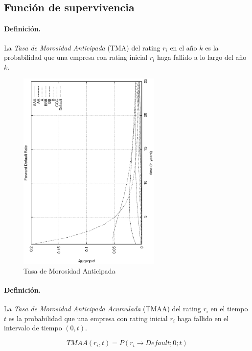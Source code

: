 \subsection{Funci\'on de supervivencia}

\paragraph{Definici\'on.} La \emph{Tasa de Morosidad Anticipada}
 (TMA) del rating $r_i$ en el a\~no $k$ es
la probabilidad que una empresa con rating inicial $r_i$ haga fallido a lo largo
del a\~no $k$.

\begin{figure}[!hb]
\begin{center}
\includegraphics[height=10cm, angle=-90]{./images/tma.ps}
\caption{Tasa de Morosidad Anticipada}
\label{tma}
\end{center}
\end{figure}

\paragraph{Definici\'on.} La \emph{Tasa de Morosidad Anticipada Acumulada}
 (TMAA) del rating $r_i$ en el
tiempo $t$ es la probabilidad que una empresa con rating inicial $r_i$ haga
fallido en el intervalo de tiempo $(0,t)$.

\begin{displaymath}
TMAA(r_i,t)=P(r_i \to Default;0;t)
\end{displaymath}


